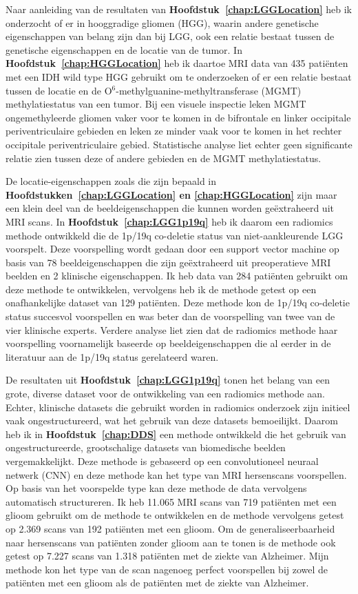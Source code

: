 Naar aanleiding van de resultaten van \textbf{Hoofdstuk~\ref{chap:LGGLocation}} heb ik onderzocht of er in hooggradige gliomen (HGG), waarin andere genetische eigenschappen van belang zijn dan bij LGG, ook een relatie bestaat tussen de genetische eigenschappen en de locatie van de tumor.
In \textbf{Hoofdstuk~\ref{chap:HGGLocation}} heb ik daartoe MRI data van 435 pati{\"e}nten met een IDH wild type HGG gebruikt om te onderzoeken of er een relatie bestaat tussen de locatie en de O$^6$-methylguanine-methyltransferase (MGMT) methylatiestatus van een tumor.
Bij een visuele inspectie leken  MGMT ongemethyleerde gliomen vaker voor te komen in de bifrontale en linker occipitale periventriculaire gebieden en leken ze minder vaak voor te komen in het rechter occipitale periventriculaire gebied.
Statistische analyse liet echter geen significante relatie zien tussen deze of andere gebieden en de MGMT methylatiestatus.

De locatie-eigenschappen zoals die zijn bepaald in \textbf{Hoofdstukken~\ref{chap:LGGLocation} en \ref{chap:HGGLocation}} zijn maar een klein deel van de beeldeigenschappen die kunnen worden ge{\"e}xtraheerd uit MRI scans.
In \textbf{Hoofdstuk~\ref{chap:LGG1p19q}} heb ik daarom een radiomics methode ontwikkeld die de 1p/19q co-deletie status van niet-aankleurende LGG voorspelt.
Deze voorspelling wordt gedaan door een support vector machine op basis van 78 beeldeigenschappen die zijn ge{\"e}xtraheerd uit preoperatieve MRI beelden en 2 klinische eigenschappen.
Ik heb data van 284 pati{\"e}nten gebruikt om deze methode te ontwikkelen, vervolgens heb ik de methode getest op een onafhankelijke dataset van 129 pati{\"e}nten.
Deze methode kon de 1p/19q co-deletie status succesvol voorspellen en was beter dan de voorspelling van twee van de vier klinische experts.
Verdere analyse liet zien dat de radiomics methode haar voorspelling voornamelijk baseerde op beeldeigenschappen die al eerder in de literatuur aan de 1p/19q status gerelateerd waren.

De resultaten uit \textbf{Hoofdstuk~\ref{chap:LGG1p19q}} tonen het belang van een grote, diverse dataset voor de ontwikkeling van een radiomics methode aan.
Echter, klinische datasets die gebruikt worden in radiomics onderzoek zijn initieel vaak ongestructureerd, wat het gebruik van deze datasets bemoeilijkt.
Daarom heb ik in \textbf{Hoofdstuk~\ref{chap:DDS}} een methode ontwikkeld die het gebruik van ongestructureerde, grootschalige datasets van biomedische beelden vergemakkelijkt.
Deze methode is gebaseerd op een convolutioneel neuraal netwerk (CNN) en deze methode kan het type van  MRI hersenscans voorspellen.
Op basis van het voorspelde type kan deze methode de data vervolgens automatisch structureren.
Ik heb 11.065 MRI scans van 719 pati{\"e}nten met een glioom gebruikt om de methode te ontwikkelen en de methode vervolgens getest op 2.369 scans van 192 pati{\"e}nten met een glioom.
Om de generaliseerbaarheid naar hersenscans van pati{\"e}nten zonder glioom aan te tonen is de methode ook getest op 7.227 scans van 1.318 pati{\"e}nten met de ziekte van Alzheimer.
Mijn methode kon het type van de scan nagenoeg perfect voorspellen bij zowel de pati{\"e}nten met een glioom als de pati{\"e}nten met de ziekte van Alzheimer.

